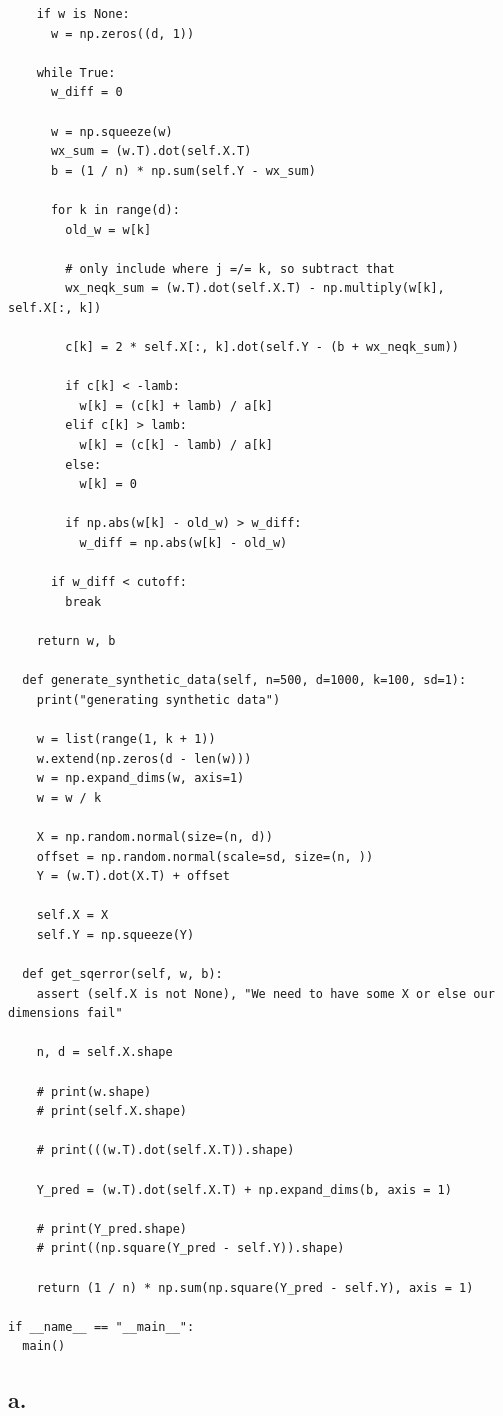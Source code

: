 \documentclass{article}
\newcommand{\1}{\mathbf{1}}
\begin{document}
{\begin{verbatim}
    if w is None:
      w = np.zeros((d, 1))

    while True:
      w_diff = 0

      w = np.squeeze(w)
      wx_sum = (w.T).dot(self.X.T)
      b = (1 / n) * np.sum(self.Y - wx_sum)
      
      for k in range(d):
        old_w = w[k]

        # only include where j =/= k, so subtract that
        wx_neqk_sum = (w.T).dot(self.X.T) - np.multiply(w[k], self.X[:, k])

        c[k] = 2 * self.X[:, k].dot(self.Y - (b + wx_neqk_sum))

        if c[k] < -lamb:
          w[k] = (c[k] + lamb) / a[k]
        elif c[k] > lamb:
          w[k] = (c[k] - lamb) / a[k]
        else: 
          w[k] = 0

        if np.abs(w[k] - old_w) > w_diff:
          w_diff = np.abs(w[k] - old_w)

      if w_diff < cutoff:
        break
    
    return w, b

  def generate_synthetic_data(self, n=500, d=1000, k=100, sd=1):
    print("generating synthetic data")

    w = list(range(1, k + 1))
    w.extend(np.zeros(d - len(w)))
    w = np.expand_dims(w, axis=1)
    w = w / k
    
    X = np.random.normal(size=(n, d))
    offset = np.random.normal(scale=sd, size=(n, ))
    Y = (w.T).dot(X.T) + offset

    self.X = X
    self.Y = np.squeeze(Y)

  def get_sqerror(self, w, b):
    assert (self.X is not None), "We need to have some X or else our dimensions fail"

    n, d = self.X.shape

    # print(w.shape)
    # print(self.X.shape)

    # print(((w.T).dot(self.X.T)).shape)

    Y_pred = (w.T).dot(self.X.T) + np.expand_dims(b, axis = 1)
    
    # print(Y_pred.shape)
    # print((np.square(Y_pred - self.Y)).shape)

    return (1 / n) * np.sum(np.square(Y_pred - self.Y), axis = 1)

if __name__ == "__main__":
  main()

\end{verbatim}

\subsection*{a.}

}
\end{document}
